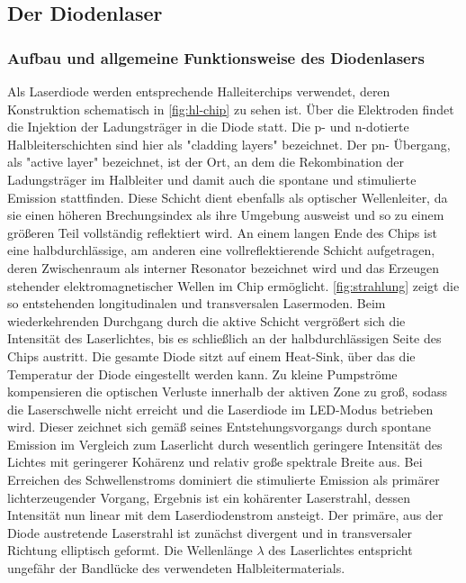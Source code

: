 \subsection{Der Diodenlaser}

\subsubsection{Aufbau und allgemeine Funktionsweise des Diodenlasers}

Als Laserdiode werden entsprechende Halleiterchips verwendet, deren Konstruktion schematisch in \autoref{fig:hl-chip} zu sehen ist.
Über die Elektroden findet die Injektion der Ladungsträger in die Diode statt. Die p- und n-dotierte Halbleiterschichten sind hier als "cladding layers" bezeichnet. Der pn- Übergang, als "active layer" bezeichnet,
ist der Ort, an dem die Rekombination der Ladungsträger im Halbleiter und damit auch die spontane und stimulierte Emission stattfinden. Diese Schicht dient ebenfalls 
als optischer Wellenleiter, da sie einen höheren Brechungsindex als ihre Umgebung ausweist und so zu einem größeren Teil vollständig reflektiert wird.\cite{diodelaserphysics}
An einem langen Ende des Chips ist eine halbdurchlässige, am anderen eine vollreflektierende Schicht aufgetragen, deren Zwischenraum als interner Resonator bezeichnet wird
und das Erzeugen stehender elektromagnetischer Wellen im Chip ermöglicht. \autoref{fig:strahlung} zeigt die so entstehenden longitudinalen und transversalen Lasermoden.
Beim wiederkehrenden Durchgang durch die aktive Schicht vergrößert sich die Intensität des Laserlichtes, bis es schließlich an der halbdurchlässigen Seite des Chips austritt.
Die gesamte Diode sitzt auf einem Heat-Sink, über das die Temperatur der Diode eingestellt werden kann.
Zu kleine Pumpströme kompensieren die optischen Verluste innerhalb der aktiven Zone zu groß, sodass die Laserschwelle nicht erreicht und die Laserdiode im LED-Modus betrieben
wird. Dieser zeichnet sich gemäß seines Entstehungsvorgangs durch spontane Emission im Vergleich zum Laserlicht durch wesentlich geringere Intensität des Lichtes mit
geringerer Kohärenz und relativ große spektrale Breite aus.
Bei Erreichen des Schwellenstroms dominiert die stimulierte Emission als primärer lichterzeugender Vorgang, Ergebnis ist ein kohärenter Laserstrahl, dessen
Intensität nun linear mit dem Laserdiodenstrom ansteigt.\cite{diodelaserphysics}
Der primäre, aus der Diode austretende Laserstrahl ist zunächst divergent und in transversaler Richtung elliptisch geformt. Die Wellenlänge $\lambda$ des Laserlichtes entspricht ungefähr
der Bandlücke des verwendeten Halbleitermaterials.


